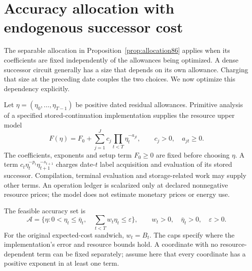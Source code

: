 \section{Accuracy allocation with endogenous successor cost}\label{sec:coupled89}
The separable allocation in Proposition~\ref{prop:allocation86} applies when its coefficients are fixed independently of the allowances being optimized. A dense successor circuit generally has a size that depends on its own allowance. Charging that size at the preceding date couples the two choices. We now optimize this dependency explicitly.

Let $\eta=(\eta_0,\ldots,\eta_{T-1})$ be positive dated residual allowances. Primitive analysis of a specified stored-continuation implementation supplies the resource upper model
\begin{equation}\label{eq:coupled-work89}
 F(\eta)=F_0+\sum_{j=1}^{J}c_j\prod_{t<T}\eta_t^{-a_{jt}},
 \qquad c_j>0,\quad a_{jt}\ge0.
\end{equation}
The coefficients, exponents and setup term $F_0\ge0$ are fixed before choosing $\eta$. A term $c_t\eta_t^{-p_t}\eta_{t+1}^{-s_{t+1}}$ charges date-$t$ label acquisition and evaluation of its stored successor. Compilation, terminal evaluation and storage-related work may supply other terms. An operation ledger is scalarized only at declared nonnegative resource prices; the model does not estimate monetary prices or energy use.

The feasible accuracy set is
\begin{equation}\label{eq:coupled-budget89}
 \mathcal A=\{\eta:0<\eta_t\le\bar\eta_t,\quad
                    \sum_{t<T}w_t\eta_t\le\varepsilon\},
 \qquad w_t>0,\quad\bar\eta_t>0,\quad\varepsilon>0.
\end{equation}
For the original expected-cost sandwich, $w_t=B_t$. The caps specify where the implementation's error and resource bounds hold. A coordinate with no resource-dependent term can be fixed separately; assume here that every coordinate has a positive exponent in at least one term.

